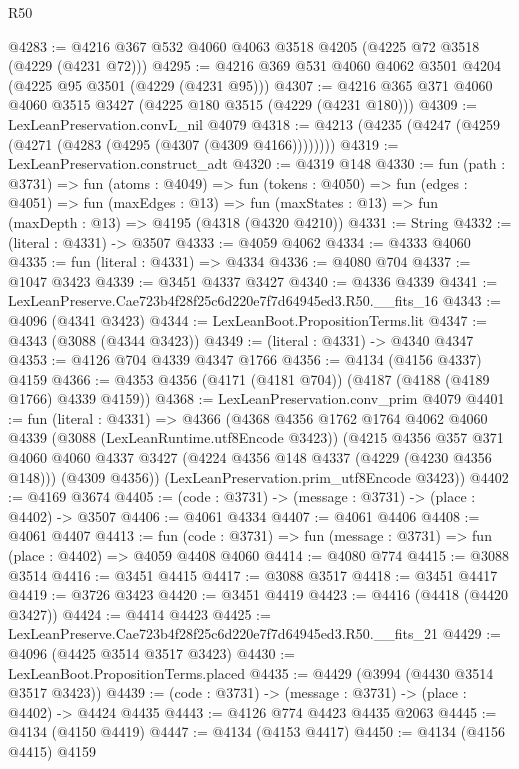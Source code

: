 \begin{lexlean}{R50}
\begin{coremodule}
@4283 := @4216 @367 @532 @4060 @4063 @3518 @4205 (@4225 @72 @3518 (@4229 (@4231 @72)))
@4295 := @4216 @369 @531 @4060 @4062 @3501 @4204 (@4225 @95 @3501 (@4229 (@4231 @95)))
@4307 := @4216 @365 @371 @4060 @4060 @3515 @3427 (@4225 @180 @3515 (@4229 (@4231 @180)))
@4309 := LexLeanPreservation.convL_nil @4079
@4318 := @4213 (@4235 (@4247 (@4259 (@4271 (@4283 (@4295 (@4307 (@4309 @4166))))))))
@4319 := LexLeanPreservation.construct_adt
@4320 := @4319 @148
@4330 := fun (path : @3731) =>
  fun (atoms : @4049) =>
  fun (tokens : @4050) =>
  fun (edges : @4051) =>
  fun (maxEdges : @13) =>
  fun (maxStates : @13) => fun (maxDepth : @13) => @4195 (@4318 (@4320 @4210))
@4331 := String
@4332 := (literal : @4331) -> @3507
@4333 := @4059 @4062
@4334 := @4333 @4060
@4335 := fun (literal : @4331) => @4334
@4336 := @4080 @704
@4337 := @1047 @3423
@4339 := @3451 @4337 @3427
@4340 := @4336 @4339
@4341 := LexLeanPreserve.Cae723b4f28f25c6d220e7f7d64945ed3.R50.__fits_16
@4343 := @4096 (@4341 @3423)
@4344 := LexLeanBoot.PropositionTerms.lit
@4347 := @4343 (@3088 (@4344 @3423))
@4349 := (literal : @4331) -> @4340 @4347
@4353 := @4126 @704 @4339 @4347 @1766
@4356 := @4134 (@4156 @4337) @4159
@4366 := @4353 @4356 (@4171 (@4181 @704)) (@4187 (@4188 (@4189 @1766) @4339 @4159))
@4368 := LexLeanPreservation.conv_prim @4079
@4401 := fun (literal : @4331) =>
  @4366
    (@4368
      @4356
      @1762
      @1764
      @4062
      @4060
      @4339
      (@3088 (LexLeanRuntime.utf8Encode @3423))
      (@4215
        @4356
        @357
        @371
        @4060
        @4060
        @4337
        @3427
        (@4224 @4356 @148 @4337 (@4229 (@4230 @4356 @148)))
        (@4309 @4356))
      (LexLeanPreservation.prim_utf8Encode @3423))
@4402 := @4169 @3674
@4405 := (code : @3731) -> (message : @3731) -> (place : @4402) -> @3507
@4406 := @4061 @4334
@4407 := @4061 @4406
@4408 := @4061 @4407
@4413 := fun (code : @3731) => fun (message : @3731) => fun (place : @4402) => @4059 @4408 @4060
@4414 := @4080 @774
@4415 := @3088 @3514
@4416 := @3451 @4415
@4417 := @3088 @3517
@4418 := @3451 @4417
@4419 := @3726 @3423
@4420 := @3451 @4419
@4423 := @4416 (@4418 (@4420 @3427))
@4424 := @4414 @4423
@4425 := LexLeanPreserve.Cae723b4f28f25c6d220e7f7d64945ed3.R50.__fits_21
@4429 := @4096 (@4425 @3514 @3517 @3423)
@4430 := LexLeanBoot.PropositionTerms.placed
@4435 := @4429 (@3994 (@4430 @3514 @3517 @3423))
@4439 := (code : @3731) -> (message : @3731) -> (place : @4402) -> @4424 @4435
@4443 := @4126 @774 @4423 @4435 @2063
@4445 := @4134 (@4150 @4419)
@4447 := @4134 (@4153 @4417)
@4450 := @4134 (@4156 @4415) @4159

\end{coremodule}
\end{lexlean}
